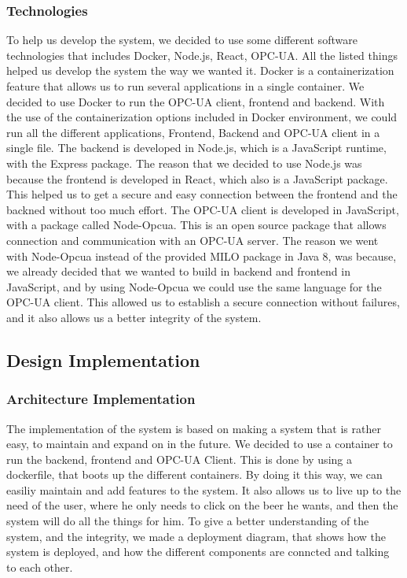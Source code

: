 \subsubsection{Technologies}
To help us develop the system, we decided to use some different software technologies that includes Docker, Node.js, React, OPC-UA. All the listed things helped us develop the system the way we wanted it.
Docker is a containerization feature that allows us to run several applications in a single container. We decided to use Docker to run the OPC-UA client, frontend and backend.
With the use of the containerization options included in Docker environment, we could run all the different applications, Frontend, Backend and OPC-UA client in a single file. \newline
The backend is developed in Node.js, which is a JavaScript runtime, with the Express package. The reason that we decided to use Node.js was because the frontend is developed in React, which also is a JavaScript package. This helped us to get a secure and easy connection between the frontend and the backned without too much effort. The OPC-UA client is developed in JavaScript, with a package called Node-Opcua. This is an open source package that allows connection and communication with an OPC-UA server.\newline
The reason we went with Node-Opcua instead of the provided MILO package in Java 8, was because, we already decided that we wanted to build in backend and frontend in JavaScript, and by using Node-Opcua we could use the same language for the OPC-UA client. This allowed us to establish a secure connection without failures, and it also allows us a better integrity of the system. \newline

\subsection{Design Implementation}

\subsubsection{Architecture Implementation}
The implementation of the system is based on making a system that is rather easy, to maintain and expand on in the future. We decided to use a container to run the backend, frontend and OPC-UA Client. This is done by using a dockerfile, that boots up the different containers.
By doing it this way, we can easiliy maintain and add features to the system. It also allows us to live up to the need of the user, where he only needs to click on the beer he wants, and then the system will do all the things for him. \newline
To give a better understanding of the system, and the integrity, we made a deployment diagram, that shows how the system is deployed, and how the different components are conncted and talking to each other. \newline


